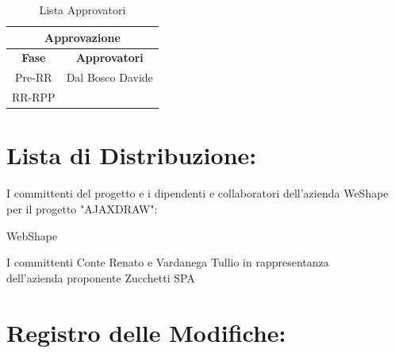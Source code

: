 \begin{table}[!h]
	\begin{center}
		\begin{tabular}
			{|c|c|}
			\hline
			\multicolumn{2}{|c|}{ \textbf{Approvazione} } \\
			\hline
			\textbf{Fase} & \textbf{Approvatori} \\
			\hline
			{Pre-RR} & Dal Bosco Davide \\
			\hline
			{RR-RPP} & \\
			\hline
		\end{tabular}
		\caption{Lista Approvatori} %
		\label{tabapprovazione}
	\end{center}
\end{table}
\textbf{}
		
\newpage 

\section*{\LARGE Lista di Distribuzione:}
\indent \indent I committenti del progetto e i dipendenti e collaboratori dell'azienda WeShape per il progetto "AJAXDRAW":	

\begin{elenconumerato}{\normindent}
		\item WebShape 
		\item I committenti Conte Renato e Vardanega Tullio in rappresentanza \\  dell'azienda proponente Zucchetti SPA
	\end{elenconumerato}


\section*{\LARGE Registro delle Modifiche:}


